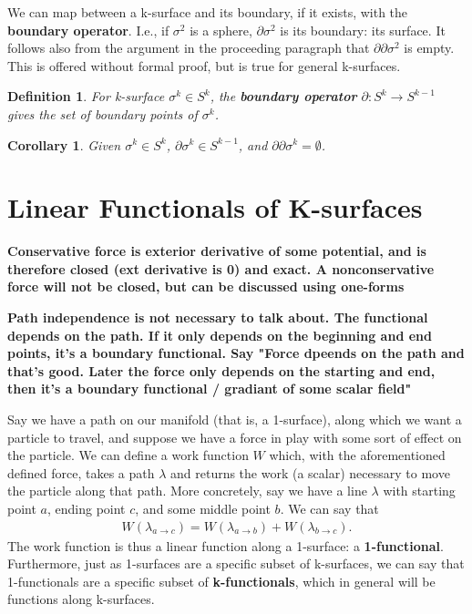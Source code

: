 \documentclass{book}
\newtheorem{defn}[equation]{Definition}
\newtheorem{coro}[equation]{Corollary}
\begin{document}
We can map between a k-surface and its boundary, if it exists, with the \textbf{boundary operator}. I.e., if $\sigma^2$ is a sphere, $\partial \sigma^2$ is its boundary: its surface. It follows also from the argument in the proceeding paragraph that $\partial\partial\sigma^2$ is empty. This is offered without formal proof, but is true for general k-surfaces. 

\begin{defn}
	For k-surface $\sigma^k \in S^k$, the \textbf{boundary operator} $\partial : S^k \to S^{k-1}$ gives the set of boundary points of $\sigma^k$. 
\end{defn}

\begin{coro}
	Given $\sigma^k \in S^k$, $\partial \sigma^k \in S^{k-1}$, and $\partial\partial \sigma^k = \emptyset$. 
\end{coro}


\section{Linear Functionals of K-surfaces}
\textbf{Conservative force is exterior derivative of some potential, and is therefore closed (ext derivative is 0) and exact. A nonconservative force will not be closed, but can be discussed using one-forms}

\textbf{Path independence is not necessary to talk about. The functional depends on the path. If it only depends on the beginning and end points, it's a boundary functional. Say "Force dpeends on the path and that's good. Later the force only depends on the starting and end, then it's a boundary functional / gradiant of some scalar field"}

Say we have a path on our manifold (that is, a 1-surface), along which we want a particle to travel, and suppose we have a force in play with some sort of effect on the particle. We can define a work function $W$ which, with the aforementioned defined force, takes a path $\lambda$ and returns the work (a scalar) necessary to move the particle along that path. More concretely, say we have a line $\lambda$ with starting point $a$, ending point $c$, and some middle point $b$. We can say that 
\begin{gather} W(\lambda_{a \to c}) = W(\lambda_{a \to b}) + W(\lambda_{b \to c}).
\end{gather}
 The work function is thus a linear function along a 1-surface: a \textbf{1-functional}. Furthermore, just as 1-surfaces are a specific subset of k-surfaces, we can say that 1-functionals are a specific subset of \textbf{k-functionals}, which in general will be functions along k-surfaces. 
\end{document}
